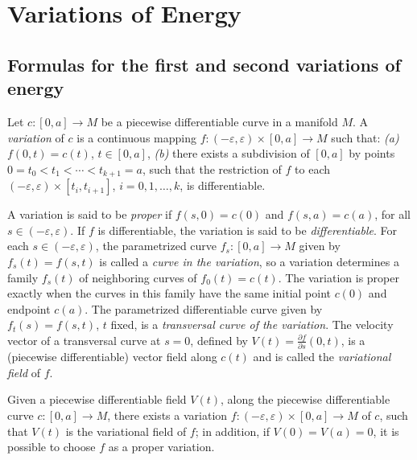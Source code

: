 \chapter{Variations of Energy}
\label{chap:dc-variations-of-energy}
\section{Formulas for the first and second variations of energy}

\begin{definition}[variation]
  \label{def:dc-ch9-2-1}


  Let $c:[0,a]\to M$ be a piecewise differentiable curve in a manifold $M$. A
  \emph{variation} of $c$ is a continuous mapping $f:(-\varepsilon,\varepsilon)\times[0,a]\to M$
  such that:
  \emph{(a)} $f(0,t)=c(t)$, $t\in[0,a]$,
  \emph{(b)} there exists a subdivision of $[0,a]$ by points
  $0=t_0<t_1<\cdots<t_{k+1}=a$, such that the restriction of $f$ to each
  $(-\varepsilon,\varepsilon)\times[t_i,t_{i+1}]$, $i=0,1,\dots,k$, is differentiable.

  A variation is said to be \emph{proper} if $f(s,0)=c(0)$ and $f(s,a)=c(a)$, for all
  $s\in(-\varepsilon,\varepsilon)$. If $f$ is differentiable, the variation is said to be
  \emph{differentiable}. For each $s\in(-\varepsilon,\varepsilon)$, the parametrized curve
  $f_s:[0,a]\to M$ given by $f_s(t)=f(s,t)$ is called a \emph{curve in the variation}, so
  a variation determines a family $f_s(t)$ of neighboring curves of $f_0(t)=c(t)$.
  The variation is proper exactly when the curves in this family have the same
  initial point $c(0)$ and endpoint $c(a)$.
  The parametrized differentiable curve given by $f_t(s)=f(s,t)$, $t$ fixed, is a
  \emph{transversal curve of the variation}. The velocity vector of a transversal curve
  at $s=0$, defined by $V(t)=\frac{\partial f}{\partial s}(0,t)$, is a (piecewise
  differentiable) vector field along $c(t)$ and is called the \emph{variational field} of
  $f$.
\end{definition}
\begin{proposition}
  \label{prop:dc-ch9-2-2}

  Given a piecewise differentiable field $V(t)$, along the piecewise differentiable
  curve $c:[0,a]\to M$, there exists a variation $f:(-\varepsilon,\varepsilon)\times[0,a]\to M$
  of $c$, such that $V(t)$ is the variational field of $f$; in addition, if
  $V(0)=V(a)=0$, it is possible to choose $f$ as a proper variation.
\end{proposition}
